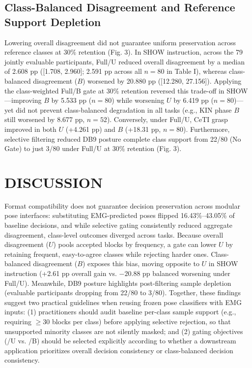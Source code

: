 \documentclass[conference,letterpaper]{IEEEtran}
\begin{document}
\subsection{Class-Balanced Disagreement and Reference Support Depletion}

Lowering overall disagreement did not guarantee uniform preservation across reference classes at 30\% retention (Fig. 3). In SHOW instruction, across the 79 jointly evaluable participants, \textrm{Full/U} reduced overall disagreement by a median of 2.608 pp ([1.708, 2.960]; 2.591 pp across all $n=80$ in Table I), whereas class-balanced disagreement ($B$) worsened by 20.880 pp ([12.280, 27.156]). Applying the class-weighted \textrm{Full/B} gate at 30\% retention reversed this trade-off in SHOW---improving $B$ by 5.533 pp ($n=80$) while worsening $U$ by 6.419 pp ($n=80$)---yet did not prevent class-balanced degradation in all tasks (e.g., KIN phase $B$ still worsened by 8.677 pp, $n=52$). Conversely, under \textrm{Full/U}, CeTI grasp improved in both $U$ (+4.261 pp) and $B$ (+18.31 pp, $n=80$). Furthermore, selective filtering reduced DB9 posture complete class support from 22/80 (\textrm{No Gate}) to just 3/80 under \textrm{Full/U} at 30\% retention (Fig. 3).

\section{DISCUSSION}

Format compatibility does not guarantee decision preservation across modular pose interfaces: substituting EMG-predicted poses flipped 16.43\%--43.05\% of baseline decisions, and while selective gating consistently reduced aggregate disagreement, class-level outcomes diverged across tasks. Because overall disagreement ($U$) pools accepted blocks by frequency, a gate can lower $U$ by retaining frequent, easy-to-agree classes while rejecting harder ones. Class-balanced disagreement ($B$) exposes this bias, moving opposite to $U$ in SHOW instruction (+2.61 pp overall gain vs. $-20.88\text{ pp}$ balanced worsening under \textrm{Full/U}). Meanwhile, DB9 posture highlights post-filtering sample depletion (evaluable participants dropping from 22/80 to 3/80). Together, these findings suggest two practical guidelines when reusing frozen pose classifiers with EMG inputs: (1) practitioners should audit baseline per-class sample support (e.g., requiring $\ge 30$ blocks per class) before applying selective rejection, so that unsupported minority classes are not silently masked; and (2) gating objectives (\textrm{/U} vs. \textrm{/B}) should be selected explicitly according to whether a downstream application prioritizes overall decision consistency or class-balanced decision consistency.
\end{document}
